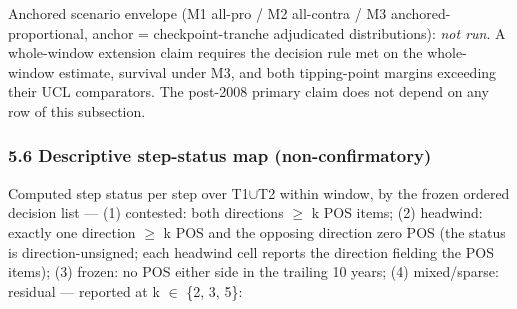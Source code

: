 Anchored scenario envelope (M1 all-pro / M2 all-contra / M3 anchored-proportional, anchor = checkpoint-tranche adjudicated distributions): \emph{not run}. A whole-window extension claim requires the decision rule met on the whole-window estimate, survival under M3, and both tipping-point margins exceeding their UCL comparators. The post-2008 primary claim does not depend on any row of this subsection.

\subsubsection{5.6 Descriptive step-status map (non-confirmatory)}\label{descriptive-step-status-map-non-confirmatory}

Computed step status per step over T1$\cup$T2 within window, by the frozen ordered decision list --- (1) contested: both directions $\ge$ k POS items; (2) headwind: exactly one direction $\ge$ k POS and the opposing direction zero POS (the status is direction-unsigned; each headwind cell reports the direction fielding the POS items); (3) frozen: no POS either side in the trailing 10 years; (4) mixed/sparse: residual --- reported at k $\in$ \{2, 3, 5\}:

